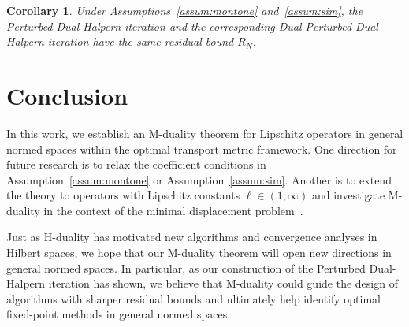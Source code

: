 \documentclass[pdflatex,sn-mathphys-num]{sn-jnl}%
\theoremstyle{thmstyleone}%
\theoremstyle{thmstyletwo}%
\theoremstyle{thmstylethree}%
\newtheorem{corollary}{Corollary}
\begin{document}
\begin{corollary}
 Under Assumptions~\ref{assum:montone} and~\ref{assum:sim}, the Perturbed Dual-Halpern iteration and the corresponding Dual Perturbed Dual-Halpern iteration have the same  residual bound $R_N$.
\end{corollary}


\section{Conclusion}\label{sec13}
In this work, we establish an M-duality theorem for Lipschitz operators in general normed spaces within the optimal transport metric framework. One direction for future research is to relax the coefficient conditions in Assumption~\ref{assum:montone} or Assumption~\ref{assum:sim}. Another is to extend the theory to operators with Lipschitz constants $\ell\in(1,\infty)$ and investigate M-duality in the context of the minimal displacement problem~\cite{g1973, d2025, bravo2026minimax}.

Just as H-duality has motivated new algorithms and convergence analyses in Hilbert spaces, we hope that our M-duality theorem will open new directions in general normed spaces. In particular, as our construction of the Perturbed Dual-Halpern iteration has shown, we believe that M-duality could guide the design of algorithms with sharper residual bounds and ultimately help identify optimal fixed-point methods in general normed spaces.





\newpage



\end{document}
